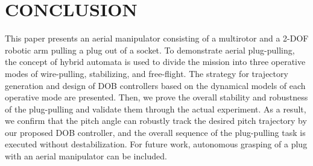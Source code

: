 \documentclass[letterpaper, 10 pt, conference]{ieeeconf}  %
\theoremstyle{definition}
\begin{document}
\section{CONCLUSION}
This paper presents an aerial manipulator consisting of a multirotor and a 2-DOF robotic arm pulling a plug out of a socket. To demonstrate aerial plug-pulling, the concept of hybrid automata is used to divide the mission into three operative modes of wire-pulling, stabilizing, and free-flight. The strategy for trajectory generation and design of DOB controllers based on the dynamical models of each operative mode are presented. Then, we prove the overall stability and robustness of the plug-pulling and validate them through the actual experiment. As a result, we confirm that the pitch angle can robustly track {the desired pitch trajectory by our proposed DOB controller}, and the overall sequence of the plug-pulling task is executed without destabilization. For future work, autonomous grasping of a plug with an aerial manipulator can be included.












% 
%
\end{document}
